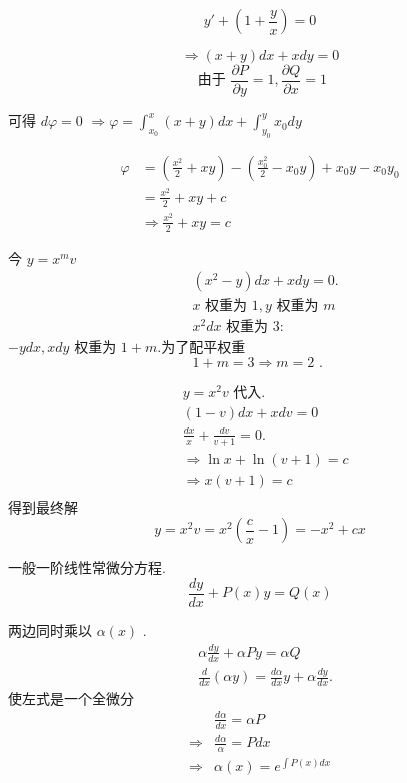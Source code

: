 \begin{example}
$$
y'+\left(1+\frac{y}{x}\right)=0
$$
\end{example}
\begin{solution}
$$
\Rightarrow(x+y) d x+x d y=0
$$
$$
\text { 由于 } \frac{\partial P}{\partial y}=1, \frac{\partial Q}{\partial x}=1
$$

可得 $d \varphi=0$
$\Rightarrow \varphi=\int_{x_0}^x(x+y) d x+\int_{y_0}^y x_0 d y$

\begin{equation}
    \begin{aligned}
    \varphi & =\left(\frac{x^2}{2}+x y\right)-\left(\frac{x_0^2}{2}-x_0 y\right)+x_0 y-x_0 y_0 \\
    & =\frac{x^2}{2}+x y+c \\
    & \Rightarrow \frac{x^2}{2}+x y=c
    \end{aligned}
    \end{equation}
\end{solution}


今 $y=x^{m}v$
$$
\begin{aligned}
& \left(x^2-y\right) d x+x d y=0 . \\
& x \text { 权重为 } 1, y\text { 权重为 }m \\
& x^2 d x \text { 权重为 } 3:
\end{aligned}
$$
$-ydx,  x d y$ 权重为 $1+m$.为了配平权重
$$
1+m=3 \Rightarrow m=2 \text { . }
$$


$$
\begin{aligned}
& y=x^2 v \text { 代入. } \\
& (1-v) d x+x d v=0 \\
& \frac{d x}{x}+\frac{d v}{v+1}=0 . \\
& \Rightarrow \ln x+\ln (v+1)=c \\
& \Rightarrow x(v+1)=c \\
\end{aligned}
$$
得到最终解
\[
    y=x^2 v=x^2\left(\frac{c}{x}-1\right) = -x^2+c x 
\]


一般一阶线性常微分方程.
$$
\frac{d y}{d x}+P(x) y=Q(x)
$$

两边同时乘以 $\alpha(x)$ .
$$
\begin{aligned}
& \alpha \frac{d y}{d x}+\alpha Py=\alpha Q \\
& \frac{d}{d x}(\alpha y)=\frac{d \alpha}{d x} y+\alpha \frac{d y}{d x} .
\end{aligned}
$$
使左式是一个全微分
$$
\begin{aligned}
& \frac{d \alpha}{d x}=\alpha P \\
\Rightarrow & \frac{d \alpha}{\alpha}=P d x \\
\Rightarrow  &  \alpha(x)=e^{\int P(x) d x}
\end{aligned}
$$


